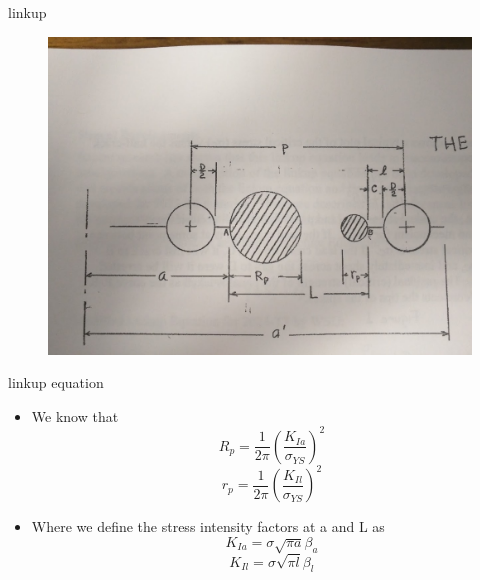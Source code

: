 \documentclass[10pt]{beamer}
\begin{document}
\begin{frame}{linkup}
	\begin{figure}
		\centering
		\includegraphics[width=0.7\linewidth]{linkup}
		\label{fig:linkup}
	\end{figure}
\end{frame}

\begin{frame}{linkup equation}
	\begin{itemize}[<+->]
		\item We know that
		\begin{equation}
		R_p = \frac{1}{2\pi}\left(\frac{K_{Ia}}{\sigma_{YS}}\right)^2
		\end{equation}
		\begin{equation}
		r_p = \frac{1}{2\pi}\left(\frac{K_{Il}}{\sigma_{YS}}\right)^2
		\end{equation}
		\item Where we define the stress intensity factors at a and L as
		\begin{equation}
		K_{Ia} = \sigma \sqrt{\pi a} \beta_a
		\end{equation}
		\begin{equation}
		K_{Il} = \sigma \sqrt{\pi l} \beta_l
		\end{equation}
	\end{itemize}
\end{frame}
\end{document}
